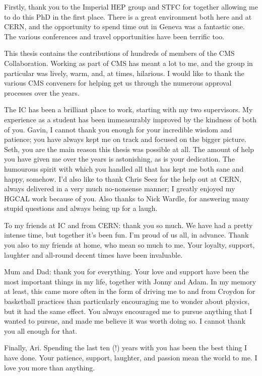Firstly, thank you to the Imperial HEP group and STFC for together 
allowing me to do this PhD in the first place. 
There is a great environment both here and at CERN, 
and the opportunity to spend time out in Geneva was a fantastic one.
The various conferences and travel opportunities have been terrific too.

This thesis contains the contributions of hundreds of members of the CMS Collaboration.
Working as part of CMS has meant a lot to me, 
and the \Hgg group in particular was lively, warm, and, at times, hilarious. 
I would like to thank the various CMS \Hgg conveners for helping get us through 
the numerous approval processes over the years.

The IC \Hgg has been a brilliant place to work, starting with my two supervisors. 
My experience as a student has been immeasurably improved by the kindness of both of you.
Gavin, I cannot thank you enough for your incredible wisdom and patience; 
you have always kept me on track and focused on the bigger picture.
Seth, you are the main reason this thesis was possible at all. 
The amount of help you have given me over the years is astonishing, 
as is your dedication. 
The humourous spirit with which you handled all that has kept me both sane and happy, somehow.
I'd also like to thank Chris Seez for the help out at CERN, 
always delivered in a very much no-nonsense manner; I greatly enjoyed my HGCAL work because of you.
Also thanks to Nick Wardle, for answering many stupid questions and always being up for a laugh.

To my friends at IC and from CERN: thank you so much. 
We have had a pretty intense time, but together it's been fun.
I'm proud of us all, in advance.
Thank you also to my friends at home, who mean so much to me.
Your loyalty, support, laughter and all-round decent times have been invaluable.

Mum and Dad: thank you for everything. 
Your love and support have been the most important things in my life, together with Jonny and Adam.
In my memory at least, this came more often in the form of driving me to and from Croydon 
for basketball practices than particularly encouraging me to wonder about physics, 
but it had the same effect.
You always encouraged me to pursue anything that I wanted to pursue, 
and made me believe it was worth doing so.
I cannot thank you all enough for that.

Finally, Ari. 
Spending the last ten (!) years with you has been the best thing I have done.
Your patience, support, laughter, and passion mean the world to me. 
I love you more than anything.


